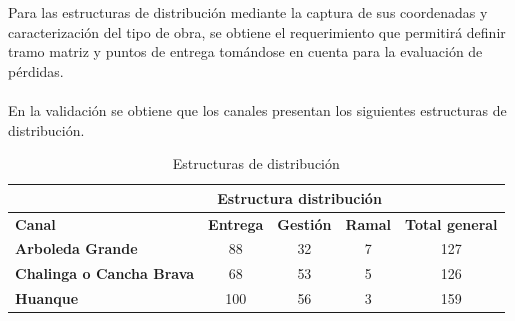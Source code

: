 \documentclass[]{article}
\begin{document}
\begin{table}[H]
\centering
\caption{Longitudes por canal}
\label{my-label}
\end{table}

Para las estructuras de distribución mediante la captura de sus coordenadas y caracterización del tipo de obra, se obtiene el requerimiento que permitirá definir tramo matriz y puntos de entrega tomándose en cuenta para la evaluación de pérdidas. \\
\\
En la validación se obtiene que los canales presentan los siguientes estructuras de distribución.

\begin{table}[H]
\centering
\caption{Estructuras de distribución}
\label{my-label}
\begin{tabular}{l|c|c|c|c}
\cline{2-4}
                                                       & \multicolumn{3}{c|}{\textbf{Estructura distribución}} & \multicolumn{1}{l}{}                        \\ \hline
\multicolumn{1}{|l|}{\textbf{Canal}}                   & \textbf{Entrega}  & \textbf{Gestión} & \textbf{Ramal} & \multicolumn{1}{c|}{\textbf{Total general}} \\ \hline
\multicolumn{1}{|l|}{\textbf{Arboleda Grande}}         & 88                & 32               & 7              & \multicolumn{1}{c|}{127}                    \\ \hline
\multicolumn{1}{|l|}{\textbf{Chalinga o Cancha Brava}} & 68                & 53               & 5              & \multicolumn{1}{c|}{126}                    \\ \hline
\multicolumn{1}{|l|}{\textbf{Huanque}}                 & 100               & 56               & 3              & \multicolumn{1}{c|}{159}                    \\ \hline
\end{tabular}
\end{table}
\end{document}
